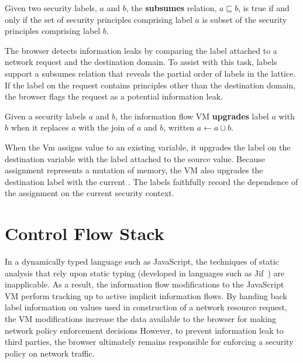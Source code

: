 \begin{definition}
  Given two security labels, $a$ and $b$, the {\bf subsumes} relation, $a \sqsubseteq b$, is true if and only if the set of security principles comprising label $a$ is subset of the security principles comprising label $b$.
\end{definition}

The browser detects information leaks by comparing the label attached to a network request and the destination domain.
To assist with this task, labels support a subsumes relation that reveals the partial order of labels in the lattice.
If the label on the request contains principles other than the destination domain, the browser flags the request as a potential information leak.

\begin{definition}
  Given a security labels $a$ and $b$, the information flow VM {\bf upgrades} label $a$ with $b$ when it replaces $a$ with the join of $a$ and $b$, written $a \gets a \sqcup b$.
\end{definition}

When the Vm assigns value to an existing variable, it upgrades the label on the destination variable with the label attached to the source value.
Because assignment represents a mutation of memory, the VM also upgrades the destination label with the current \pclabel.
The labels faithfully record the dependence of the assignment on the current security context.


\section{Control Flow Stack}
\label{sec:control-flow-stack}

In a dynamically typed language such as JavaScript, the techniques of static analysis that rely upon static typing (developed in languages such as Jif~\cite{jif}) are inapplicable.
As a result, the information flow modifications to the JavaScript VM perform tracking up to active implicit information flows.
By handing back label information on values used in construction of a network resource request, the VM modifications increase the data available to the browser for making network policy enforcement decisions 
However, to prevent information leak to third parties, the browser ultimately remains responsible for enforcing a security policy on network traffic.

